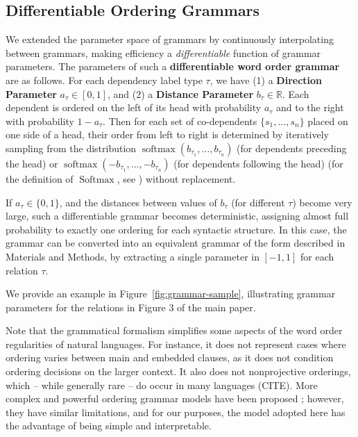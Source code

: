 \documentclass[10pt,twoside,lineno]{article}
\newcommand{\key}[1]{\textbf{#1}}
\begin{document}
\subsection{Differentiable Ordering Grammars}\label{sec:diff-gramm}

We extended the parameter space of grammars by continuously interpolating between grammars, making efficiency a \emph{differentiable} function of grammar parameters.
The parameters of such a \key{differentiable word order grammar} are as follows. 
For each dependency label type $\tau$, we have (1) a \key{Direction Parameter} $a_\tau \in [0,1]$, and (2) a \key{Distance Parameter} $b_\tau \in \mathbb{R}$. 
Each dependent is ordered on the left of its head with probability $a_\tau$ and to the right with probability $1-a_\tau$. 
Then for each set of co-dependents $\{s_1, \dots , s_n\}$ placed on one side of a head, their order from left to right is determined by iteratively sampling from the distribution $\operatorname{softmax}(b_{\tau_1}, \dots, b_{\tau_n})$ (for dependents preceding the head) or $\operatorname{softmax}(-b_{\tau_1}, \dots, -b_{\tau_n})$ (for dependents following the head) (for the definition of $\operatorname{Softmax}$, see \cite[p. 184]{goodfellow2016deep}) without replacement.

If $a_\tau \in \{0, 1\}$, and the distances between values of $b_\tau$ (for different $\tau$) become very large, such a differentiable grammar becomes deterministic, assigning almost full probability to exactly one ordering for each syntactic structure.
In this case, the grammar can be converted into an equivalent grammar of the form described in Materials and Methods, by extracting a single parameter in $[-1, 1]$ for each relation $\tau$.

We provide an example in Figure~\ref{fig:grammar-sample}, illustrating grammar parameters for the relations in Figure 3 of the main paper.

Note that the grammatical formalism simplifies some aspects of the word order regularities of natural languages.
For instance, it does not represent cases where ordering varies between main and embedded clauses, as it does not condition ordering decisions on the larger context.
It also does not nonprojective orderings, which -- while generally rare -- do occur in many languages (CITE).
More complex and powerful ordering grammar models have been proposed \cite{futrell2015experiments, wang2016galactic}; however, they have similar limitations, and for our purposes, the model adopted here has the advantage of being simple and interpretable.
\end{document}
